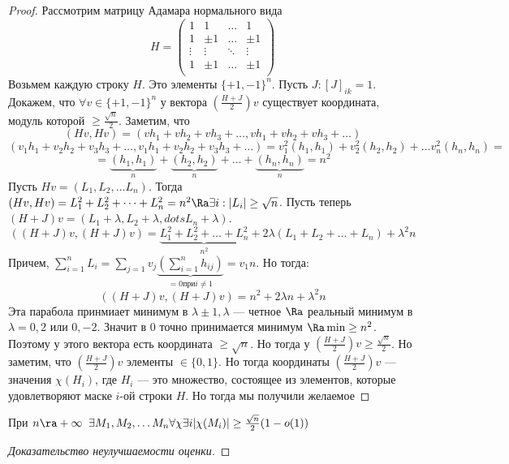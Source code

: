\begin{proof}
  Рассмотрим матрицу Адамара нормального вида 
  \[H = \left(\begin{array}{cccc}
    1 & 1 & \dots &  1 \\
    1 & \pm 1 & \dots & \pm 1 \\
    \vdots & \vdots & \ddots & \vdots\\
    1 & \pm 1 & \dots & \pm 1 \\
\end{array}\right)\]
Возьмем каждую строку \(H\). Это элементы \(\{+1, -1\}^n\). Пусть \(J: [J]_{ik} = 1\). Докажем, что \(\forall v \in \{+1, -1\}^n\) у вектора \(\left(\frac{H + J}{2}\right)v\) существует координата, модуль которой \(\ge \frac{\sqrt{n}}{2}\). Заметим, что 
\[(Hv, Hv) = (vh_1 + vh_2 + vh_3 + \dots, vh_1 + vh_2 + vh_3 + \dots)\]
\[(v_1h_1 + v_2h_2 + v_3h_3 + \dots, v_1h_1 + v_2h_2 + v_3h_3 + \dots) = v_1^2(h_1, h_1) + v_2^2(h_2, h_2) + \dots v_n^2(h_n, h_n) = \]
\[ = \underbrace{(h_1, h_1)}_{n}  + \underbrace{(h_2, h_2)}_{n}  + \dots  + \underbrace{(h_n, h_n)}_{n} = n^2\]
Пусть \(Hv = (L_1, L_2, \dots L_n)\). Тогда \((Hv, Hv) = L_1^2 + L_2^2 + \dots + L_n^2 = n^2 \Ra \exists i : |L_i| \ge \sqrt{n}\). Пусть теперь \((H + J)v = (L_1 + \lambda, L_2 + \lambda, dots L_n + \lambda)\). 
\[((H + J)v, (H + J)v) = \underbrace{L_1^2 + L_2^2 + \dots + L_n^2}_{n^2} + 2\lambda(L_1 + L_2 + \dots + L_n) + \lambda^2n\]
Причем, \(\sum_{i = 1}^nL_i = \sum_{j = 1}v_j\underbrace{\left(\sum_{i = 1}^nh_{ij}\right)}_{= 0 \text{при} i \ne 1} = v_1n\). Но тогда:
\[((H + J)v, (H + J)v) = n^2 + 2\lambda n + \lambda^2n\]
Эта парабола принмиает минимум в \(\lambda \pm 1, \lambda\) --- четное \(\Ra\) реальный минимум в \(\lambda = 0, 2\) или \(0, -2\). Значит в \(0\) точно принимается минимум \(\Ra \min \ge n^2\). Поэтому у этого вектора есть координата \(\ge \sqrt{n}\). Но тогда у \(\left(\frac{H + J}{2}\right)v \ge \frac{\sqrt{n}}{2}\). Но заметим, что \(\left(\frac{H + J}{2}\right)v\) элементы \(\in \{0, 1\}\). Но тогда координаты \(\left(\frac{H + J}{2}\right)v\) --- значения \(\chi(H_i)\), где \(H_i\) --- это множество, состоящее из элементов, которые удовлетворяют маске \(i\)-ой строки \(H\). Но тогда мы получили желаемое
\end{proof}
\begin{corollary}
  При \(n \ra +\infty\;\;\exists M_1, M_2, \dots M_n \forall \chi \exists i |\chi(M_i)| \ge \frac{\sqrt{n}}{2}(1 - o(1))\)
\end{corollary}
\begin{proof}[Доказательство неулучшаемости оценки]

\end{proof}